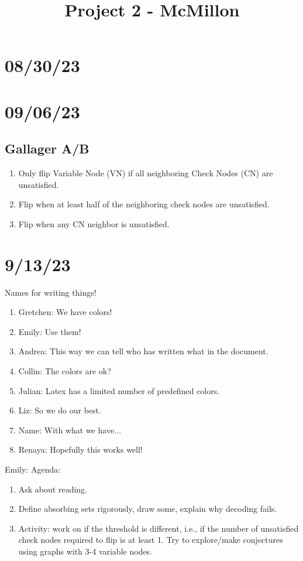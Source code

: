 \documentclass{article}
\title{Project 2 - McMillon}
\newcommand{\gretchen}[1]{{\color{blue} \sf Gretchen: #1}}
\newcommand{\emily}[1]{{\color{teal} \sf Emily: #1}}
\newcommand{\andrea}[1]{{\color{gray} \sf Andrea: #1}}
\newcommand{\collin}[1]{{\color{red} \sf Collin: #1}}
\newcommand{\julian}[1]{{\color{violet} \sf Julian: #1}}
\newcommand{\liz}[1]{{\color{olive} \sf Liz: #1}}
\newcommand{\name}[1]{{\color{purple} \sf Name: #1}}
\newcommand{\renaya}[1]{{\color{orange} \sf Renaya: #1}}
\begin{document}
\maketitle

\section*{08/30/23}

\section*{09/06/23}
\subsection{Gallager A/B}

\begin{enumerate}
    \item Only flip Variable Node (VN) if all neighboring Check Nodes (CN) are unsatisfied.
    \item Flip when at least half of the neighboring check nodes are unsatisfied.
    \item Flip when any CN neighbor is unsatisfied.
\end{enumerate}

\section*{9/13/23}

Names for writing things!
\begin{enumerate}
    \item \gretchen{We have colors!}
    \item \emily{Use them!}
    \item \andrea{This way we can tell who has written what in the document.}
    \item \collin{The colors are ok?}
    \item \julian{Latex has a limited number of predefined colors.}
    \item \liz{So we do our best.}
    \item \name{With what we have...}
    \item \renaya{Hopefully this works well!}
\end{enumerate}

\emily{Agenda:
    \begin{enumerate}
        \item Ask about reading.
        \item Define absorbing sets rigorously, draw some, explain why decoding fails.
        \item Activity: work on if the threshold is different, i.e., if the number of unsatisfied check nodes required to flip is at least 1. Try to explore/make conjectures using graphs with 3-4 variable nodes.
    \end{enumerate}}
\end{document}
